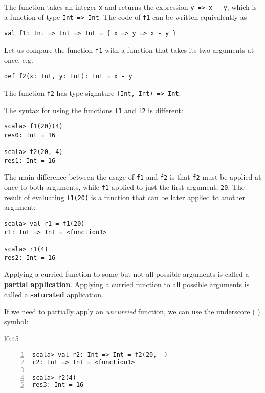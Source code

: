 The function takes an integer \lstinline!x! and returns the expression
\lstinline!y => x - y!, which is a function of type \lstinline!Int => Int!.
The code of \lstinline!f1! can be written equivalently as
\begin{lstlisting}
val f1: Int => Int => Int = { x => y => x - y }
\end{lstlisting}

Let us compare the function \lstinline!f1! with a function that takes
its two arguments at once, e.g.
\begin{lstlisting}
def f2(x: Int, y: Int): Int = x - y
\end{lstlisting}
The function \lstinline!f2! has type signature \lstinline!(Int, Int) => Int!.

The syntax for using the functions \lstinline!f1! and \lstinline!f2!
is different:
\begin{lstlisting}
scala> f1(20)(4)
res0: Int = 16

scala> f2(20, 4)
res1: Int = 16
\end{lstlisting}
The main difference between the usage of \lstinline!f1! and \lstinline!f2!
is that \lstinline!f2! must be applied at once to both arguments,
while \lstinline!f1! applied to just the first argument, \lstinline!20!.
The result of evaluating \lstinline!f1(20)! is a function that can
be later applied to another argument:
\begin{lstlisting}
scala> val r1 = f1(20)
r1: Int => Int = <function1> 

scala> r1(4)
res2: Int = 16
\end{lstlisting}

Applying a curried function to some but not all possible arguments
is called a \textbf{partial application}.
Applying a curried function to all possible arguments is called a
\textbf{saturated} application.

If we need to partially apply an \emph{uncurried} function, we can
use the underscore ($\_$) symbol:

\begin{wrapfigure}{l}{0.45\columnwidth}%
\vspace{-0.9\baselineskip}
\begin{lstlisting}[numbers=left]
scala> val r2: Int => Int = f2(20, _)
r2: Int => Int = <function1>

scala> r2(4)
res3: Int = 16
\end{lstlisting}
\vspace{-0.95\baselineskip}
\end{wrapfigure}%

